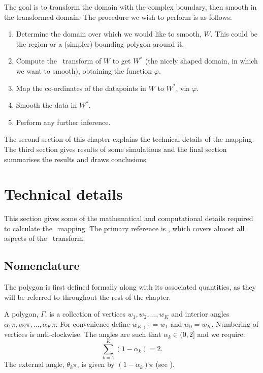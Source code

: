 The goal is to transform the domain with the complex boundary, then smooth in the transformed domain. The procedure we wish to perform is as follows:

\begin{enumerate}
\item Determine the domain over which we would like to smooth, $W$. This could be the region or a (simpler) bounding polygon around it.

\item Compute the \sch\ transform of $W$ to get $W^*$ (the nicely shaped domain, in which we want to smooth), obtaining the function $\varphi$.

\item Map the co-ordinates of the datapoints in $W$ to $W^*$, via $\varphi$.

\item Smooth the data in $W^*$.

\item Perform any further inference.
\end{enumerate}

The second section of this chapter explains the technical details of the mapping. The third section gives results of some simulations and the final section summarises the results and draws conclusions.

\section{Technical details}

This section gives some of the mathematical and computational details required to calculate the \sch\ mapping. The primary reference is , which covers almost all aspects of the \sch\ transform.

\subsection{Nomenclature}
\label{sc-nomen}

The polygon is first defined formally along with its associated quantities, as they will be referred to throughout the rest of the chapter.

A polygon, $\Gamma$, is a collection of vertices $w_1, w_2,\dots,w_K$ and interior angles $\alpha_1\pi, \alpha_2\pi, \dots, \alpha_K\pi$. For convenience define $w_{K+1} = w_1$ and $w_0=w_K$. Numbering of vertices is anti-clockwise. The angles are such that $\alpha_k \in (0,2]$ and we require:
\begin{equation}
\sum_{k=1}^K (1-\alpha_k) = 2.
\end{equation}
The external angle, $\theta_k\pi$, is given by $(1-\alpha_k)\pi$ (see ).

